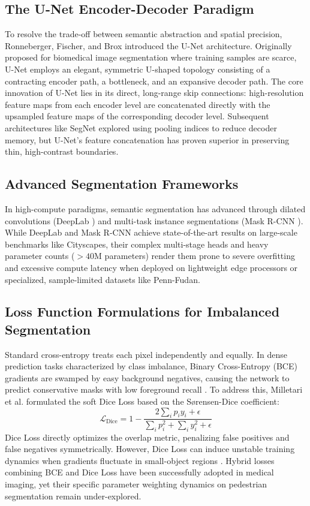 \documentclass[10pt,a4paper]{report}
\begin{document}
\subsection{The U-Net Encoder-Decoder Paradigm}
To resolve the trade-off between semantic abstraction and spatial precision, Ronneberger, Fischer, and Brox \cite{ronneberger2015unet} introduced the U-Net architecture. Originally proposed for biomedical image segmentation where training samples are scarce, U-Net employs an elegant, symmetric U-shaped topology consisting of a contracting encoder path, a bottleneck, and an expansive decoder path. The core innovation of U-Net lies in its direct, long-range skip connections: high-resolution feature maps from each encoder level are concatenated directly with the upsampled feature maps of the corresponding decoder level. Subsequent architectures like SegNet \cite{badrinarayanan2017segnet} explored using pooling indices to reduce decoder memory, but U-Net's feature concatenation has proven superior in preserving thin, high-contrast boundaries.

\subsection{Advanced Segmentation Frameworks}
In high-compute paradigms, semantic segmentation has advanced through dilated convolutions (DeepLab \cite{chen2017deeplab}) and multi-task instance segmentations (Mask R-CNN \cite{he2017maskrcnn}). While DeepLab and Mask R-CNN achieve state-of-the-art results on large-scale benchmarks like Cityscapes, their complex multi-stage heads and heavy parameter counts ($>40$M parameters) render them prone to severe overfitting and excessive compute latency when deployed on lightweight edge processors or specialized, sample-limited datasets like Penn-Fudan.

\subsection{Loss Function Formulations for Imbalanced Segmentation}
Standard cross-entropy treats each pixel independently and equally. In dense prediction tasks characterized by class imbalance, Binary Cross-Entropy (BCE) gradients are swamped by easy background negatives, causing the network to predict conservative masks with low foreground recall \cite{jadon2020survey}. To address this, Milletari et al. \cite{milletari2016vnet} formulated the soft Dice Loss based on the Sørensen-Dice coefficient:
\begin{equation}
\mathcal{L}_{\text{Dice}} = 1 - \frac{2 \sum_i p_i y_i + \epsilon}{\sum_i p_i^2 + \sum_i y_i^2 + \epsilon}
\end{equation}
Dice Loss directly optimizes the overlap metric, penalizing false positives and false negatives symmetrically. However, Dice Loss can induce unstable training dynamics when gradients fluctuate in small-object regions \cite{sudre2017generalised}. Hybrid losses combining BCE and Dice Loss have been successfully adopted in medical imaging, yet their specific parameter weighting dynamics on pedestrian segmentation remain under-explored.
\end{document}
